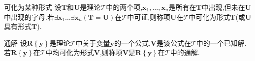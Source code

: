 \begin{definition}{可化为某种形式}{}
	设$\boldsymbol{T}$和$\boldsymbol{U}$是理论$\mathcal{T}$中的两个项,$\boldsymbol{x}_{1},\ldots,\boldsymbol{x}_{n}$是所有在$\boldsymbol{T}$中出现,但未在$\boldsymbol{U}$中出现的字母.若$\exists\boldsymbol{x}_{1}\ldots\exists\boldsymbol{x}_{n}\left(\boldsymbol{T}=\boldsymbol{U}\right)$在$\mathcal{T}$中可证,则称项$\boldsymbol{U}$在$\mathcal{T}$中可化为形式$\boldsymbol{T}$(或$\boldsymbol{U}$具有形式$\boldsymbol{T}$).
\end{definition}

\begin{definition}{通解}{}
	设$\boldsymbol{R}\left\{\boldsymbol{y}\right\}$是理论$\mathcal{T}$中关于变量$\boldsymbol{y}$的一个公式,$\boldsymbol{V}$是该公式在$\mathcal{T}$中的一个已知解.若$\boldsymbol{R}\left\{\boldsymbol{y}\right\}$在$\mathcal{T}$中均可化为形式$\boldsymbol{V}$,则称项$\boldsymbol{V}$是$\boldsymbol{R}\left\{\boldsymbol{y}\right\}$在$\mathcal{T}$中的通解.
\end{definition}

